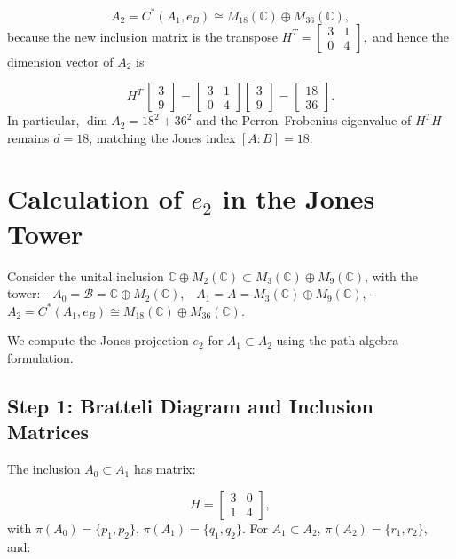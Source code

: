 \documentclass[11pt]{article}
\theoremstyle{mytheoremstyle}
\theoremstyle{definition}
\theoremstyle{remark}
\begin{document}
\[
  A_2 = C^*(A_1,e_{B}) \cong M_{18}(\mathbb{C})\oplus M_{36}(\mathbb{C}),
\]
because the new inclusion matrix is the transpose
\( H^{T} = \begin{bmatrix}3&1\\
0&4\end{bmatrix}, \)
and hence the dimension vector of \(A_2\) is

\[
  H^{\!T}\,\begin{bmatrix}3\\9\end{bmatrix}
  = 
  \begin{bmatrix}3&1\\
  0&4\end{bmatrix}
  \begin{bmatrix}3\\9\end{bmatrix}
  =\begin{bmatrix}18\\36\end{bmatrix}.
\]
In particular, \(\dim A_2 = 18^2 + 36^2\) and the Perron–Frobenius eigenvalue
of \(H^{T}H\) remains \(d=18\), matching the Jones index \([A:B]=18\).


\section*{Calculation of \( e_2 \) in the Jones Tower}

Consider the unital inclusion \( \mathbb{C} \oplus M_2(\mathbb{C}) \subset M_3(\mathbb{C}) \oplus M_9(\mathbb{C}) \), with the tower:
- \( A_0 = \mathcal{B} = \mathbb{C} \oplus M_2(\mathbb{C}) \),
- \( A_1 = A = M_3(\mathbb{C}) \oplus M_9(\mathbb{C}) \),
- \( A_2 = C^*(A_1, e_B) \cong M_{18}(\mathbb{C}) \oplus M_{36}(\mathbb{C}) \).

We compute the Jones projection \( e_2 \) for \( A_1 \subset A_2 \) using the path algebra formulation.
\medskip

\subsection*{Step 1: Bratteli Diagram and Inclusion Matrices}
The inclusion \( A_0 \subset A_1 \) has matrix:

\[
H = \begin{bmatrix} 3 & 0 \\ 1 & 4 \end{bmatrix},
\]
with \( \pi(A_0) = \{ p_1, p_2 \} \), \( \pi(A_1) = \{ q_1, q_2 \} \). For \( A_1 \subset A_2 \), \( \pi(A_2) = \{ r_1, r_2 \} \), and:
\end{document}
